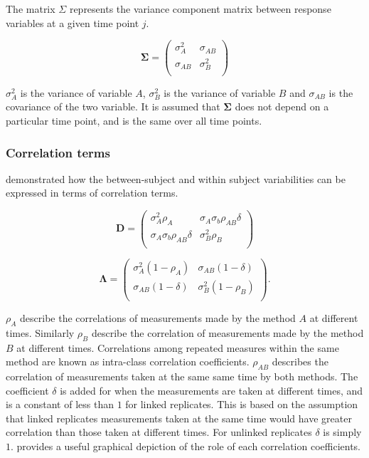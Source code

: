 \documentclass[12pt, a4paper]{report}
\theoremstyle{plain}
\theoremstyle{definition}
\theoremstyle{remark}
\begin{document}
	The matrix $\Sigma$ represents the variance component matrix between response variables at a given time point $j$.
	
	\[
	\boldsymbol{\Sigma} = \left( \begin{array}{cc}
	\sigma^2_{A} & \sigma_{AB} \\
	\sigma_{AB} & \sigma^2_{B}\\
	\end{array}   \right)
	\]
	
	$\sigma^2_{A}$ is the variance of variable $A$, $\sigma^2_{B}$ is the variance of variable $B$ and $\sigma_{AB}$ is the covariance of the two variable. It is assumed that $\boldsymbol{\Sigma}$ does not depend on a particular time point, and is the same over all time points.
	
	
	\subsubsection{Correlation terms}
	\citet{hamlett} demonstrated how the between-subject and within subject variabilities can be expressed in terms of
	correlation terms.
	
	\[
	\boldsymbol{D} = \left( \begin{array}{cc}
	\sigma^2_{A}\rho_{A} & \sigma_{A}\sigma_{b}\rho_{AB}\delta \\
	\sigma_{A}\sigma_{b}\rho_{AB}\delta & \sigma^2_{B}\rho_{B}\\
	
	\end{array}\right)
	\]
	
	\[
	\boldsymbol{\Lambda} = \left(
	\begin{array}{cc}
	\sigma^2_{A}(1-\rho_{A}) & \sigma_{AB}(1-\delta)  \\
	\sigma_{AB}(1-\delta) & \sigma^2_{B}(1-\rho_{B}) \\
	\end{array}\right).
	\]
	
	$\rho_{A}$ describe the correlations of measurements made by the method $A$ at different times. Similarly $\rho_{B}$ describe the correlation of measurements made by the method $B$ at different times. Correlations among repeated measures within the same method are known as intra-class correlation coefficients. $\rho_{AB}$ describes the correlation of measurements taken at the same same time by both methods. The coefficient $\delta$ is added for when the measurements are taken at different times, and is a constant of less than $1$ for linked replicates. This is based on the assumption that linked replicates measurements taken at the same time would have greater correlation than those taken at different times. For unlinked replicates $\delta$ is simply $1$. \citet{hamlett} provides a useful graphical depiction of the role of each correlation coefficients.
	
\end{document}
